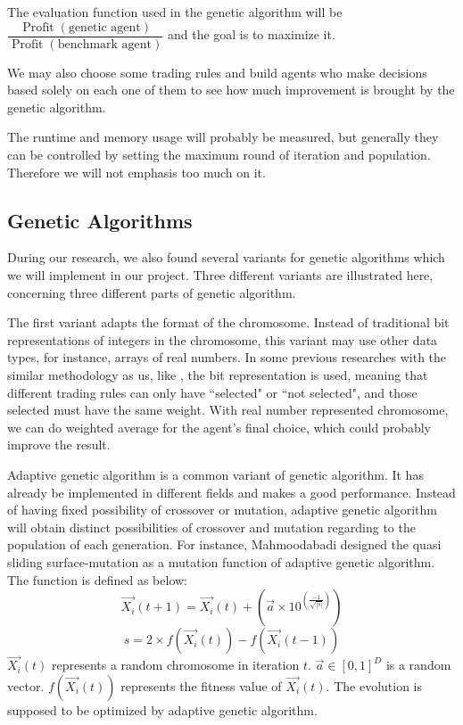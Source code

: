 \documentclass{article}
\begin{document}
The evaluation function used in the genetic algorithm will be
$\dfrac{
		\operatorname{Profit}(\text{genetic agent})
	}{
		\operatorname{Profit}(\text{benchmark agent})
	}$ and the goal is to maximize it.

We may also choose some trading rules and build agents who make decisions based solely
on each one of them to see how much improvement is brought by the genetic algorithm.

The runtime and memory usage will probably be measured,
but generally they can be controlled by setting the maximum round of iteration and population.
Therefore we will not emphasis too much on it.

\subsection{Genetic Algorithms}

During our research, we also found several variants for genetic algorithms which we will implement in our project.
Three different variants are illustrated here, concerning three different parts of genetic algorithm.

The first variant adapts the format of the chromosome.
Instead of traditional bit representations of integers in the chromosome,
this variant may use other data types, for instance, arrays of real numbers.
In some previous researches with the similar methodology as us,
like \cite{genetic-algorithms-for-predicting-the-egyptian-stock-market},
the bit representation is used, meaning that different trading rules can only have ``selected" or ``not selected",
and those selected must have the same weight.
With real number represented chromosome, we can do weighted average for the agent's final choice,
which could probably improve the result.

Adaptive genetic algorithm is a common variant of genetic algorithm.
It has already be implemented in different fields and makes a good performance.\cite{an-adaptive-genetic-algorithm-with-dominated-genes} \cite{an-adaptive-genetic-algorithm-for-crystal-structure-prediction}
Instead of having fixed possibility of crossover or mutation,
adaptive genetic algorithm will obtain distinct possibilities of crossover and mutation
regarding to the population of each generation.
For instance, Mahmoodabadi designed the quasi sliding surface-mutation as a mutation function of adaptive genetic algorithm.\cite{a-novel-adaptive-genetic-algorithm-for-global-optimization}
The function is defined as below:
$$\overrightarrow{X_i}(t+1) = \overrightarrow{X_i}(t) + (\overrightarrow{a} \times 10^{(\frac{-1}{\sqrt{|s|}})})$$
$$s = 2 \times f(\overrightarrow{X_i}(t)) - f(\overrightarrow{X_i}(t-1))$$
$\overrightarrow{X_i}(t)$ represents a random chromosome in iteration $t$.
$\overrightarrow{a} \in [0,1]^D$ is a random vector.
$f(\overrightarrow{X_i}(t))$ represents the fitness value of $\overrightarrow{X_i}(t)$. \cite{a-novel-adaptive-genetic-algorithm-for-global-optimization}
The evolution is supposed to be optimized by adaptive genetic algorithm.
\end{document}
